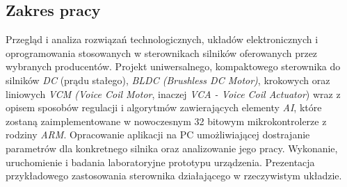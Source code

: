 \subsection*{Zakres pracy}
Przegląd i analiza rozwiązań technologicznych, układów elektronicznych i oprogramowania stosowanych w sterownikach silników oferowanych przez wybranych producentów. Projekt uniwersalnego, kompaktowego sterownika do silników {\it DC} (prądu stałego), {\it BLDC (Brushless DC Motor)}, krokowych oraz liniowych {\it VCM (Voice Coil Motor}, inaczej {\it VCA - Voice Coil Actuator}) wraz z opisem sposobów regulacji i algorytmów zawierających elementy {\it AI}, które zostaną zaimplementowane w nowoczesnym 32 bitowym mikrokontrolerze z rodziny {\it ARM}. Opracowanie aplikacji na PC umożliwiającej dostrajanie parametrów dla konkretnego silnika oraz analizowanie jego pracy. Wykonanie, uruchomienie i badania laboratoryjne prototypu urządzenia. Prezentacja przykładowego zastosowania sterownika działającego w rzeczywistym układzie.

\clearpage
